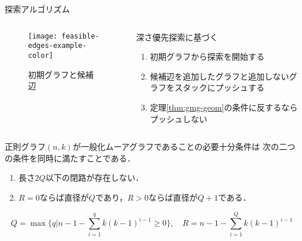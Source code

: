 \begin{frame}[allowframebreaks]{探索アルゴリズム}
  \begin{columns}
    \begin{column}{.4\textwidth}
      \begin{figure}
        \centering
        \texttt{[image: feasible-edges-example-color]}
        \caption{初期グラフと候補辺}
      \end{figure}
    \end{column}
    \begin{column}{.6\textwidth}
      \small
      \par 深さ優先探索に基づく
      \begin{enumerate}
      \item 初期グラフから探索を開始する
      \item 候補辺を追加したグラフと追加しないグラフをスタックにプッシュする
      \item 定理\ref{thm:gmg-geom}の条件に反するならプッシュしない
      \end{enumerate}
    \end{column}
  \end{columns}
  \vspace*{-1em}
  \begin{theorem}
    \label{thm:gmg-geom}
    {\scriptsize
    正則グラフ$(n,k)$が一般化ムーアグラフであることの必要十分条件は
    次の二つの条件を同時に満たすことである．
    \begin{enumerate}
    \item 長さ$2Q$以下の閉路が存在しない．
      \label{itm:gmg-geom-1}
    \item $R=0$ならば直径が$Q$であり，$R>0$ならば直径が$Q+1$である．
      \label{itm:gmg-geom-2}
    \end{enumerate}
    \[ Q=\max\{q|n-1-\sum_{i=1}^{q}k(k-1)^{i-1}\geq 0\},\quad
    R=n-1-\sum_{i=1}^{Q}k(k-1)^{i-1} \]
    }
  \end{theorem}
\end{frame}


